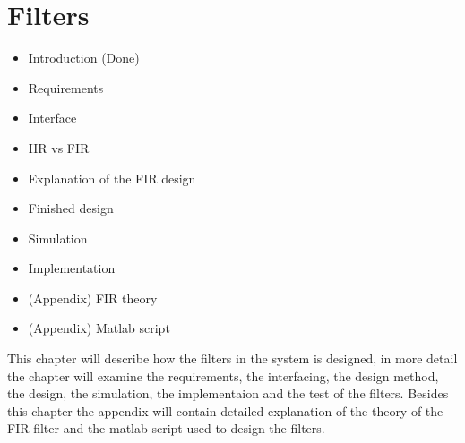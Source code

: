 \chapter{Filters}

\begin{itemize}
\item Introduction (Done)
\item Requirements
\item Interface
\item IIR vs FIR
\item Explanation of the FIR design 
\item Finished design 
\item Simulation
\item Implementation 
\item (Appendix) FIR theory
\item (Appendix) Matlab script
\end{itemize} 

This chapter will describe how the filters in the system is designed, in more detail the chapter will examine the requirements, the interfacing, the design method, the design, the simulation, the implementaion and the test of the filters. Besides this chapter the appendix will contain detailed explanation of the theory of the FIR filter and the matlab script used to design the filters.       









